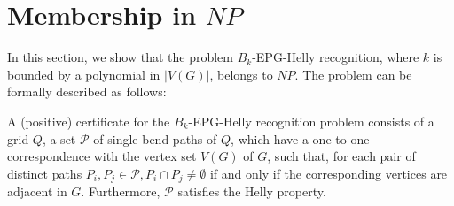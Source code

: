 \documentclass[preprint,12pt]{elsarticle} %
\begin{document}







\section{Membership in $NP$}

In this section, we show that the problem $B_k$-EPG-Helly recognition, where $k$ is bounded by a polynomial in $|V(G)|$, belongs to $NP$. The problem can be formally described as follows:




A (positive) certificate for the {\sc $B_k$-EPG-Helly recognition} problem consists of a grid $Q$, a set $\mathcal{P}$ of single bend paths of $Q$, which have a one-to-one correspondence with the vertex set $V(G)$ of $G$, such that, for each pair of distinct paths $P_i, P_j\in \mathcal{P}, P_i\cap P_j \neq \emptyset $ if and only if the corresponding vertices are adjacent in $G$. Furthermore, $\mathcal{P}$ satisfies the Helly property.


\end{document}
